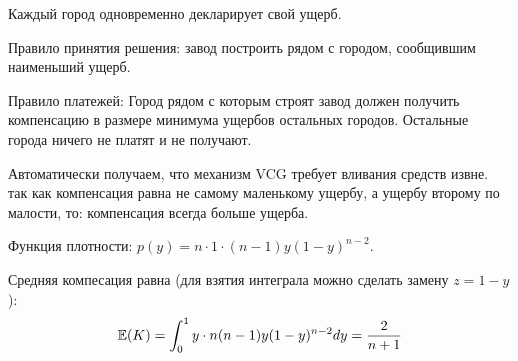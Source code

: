 \begin{enumerate}
Каждый город одновременно декларирует свой ущерб. 

Правило принятия решения: завод построить рядом с городом, сообщившим наименьший ущерб.

Правило платежей: Город рядом с которым строят завод должен получить компенсацию в размере минимума ущербов остальных городов. Остальные города ничего не платят и не получают. 

Автоматически получаем, что механизм VCG требует вливания средств извне. так как компенсация равна не самому маленькому ущербу, а ущербу второму по малости, то: компенсация всегда больше ущерба.

Функция плотности: $ p(y)=n\cdot 1\cdot (n-1)y(1-y)^{n-2} $.

Средняя компесация равна (для взятия интеграла можно сделать замену $ z=1-y $): 
\begin{equation}
\mathbb{E}(K)=\int_{0}^{1}y\cdot n(n-1)y(1-y)^{n-2}dy=\frac{2}{n+1}
\end{equation}








\end{enumerate}

